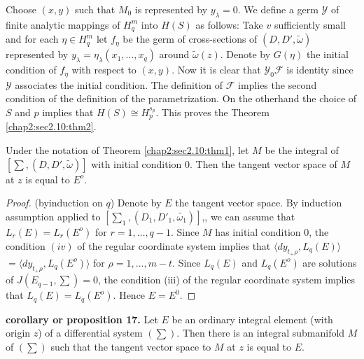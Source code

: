 \setcounter{proof of theorem}{1}
\begin{proof of theorem}%
  Choose $(x, y)$ such that $M_0$ is represented by $y_\lambda =
  0$. We define a germ $\mathscr{Y}$ of finite analytic mappings of
  $H^m_q$ into $H(S)$ as follows: Take $v$ sufficiently small and for
  each $\eta \in H^m_q$ let $f_\eta$ be the germ of cross-sections of
  $(D, D' , \tilde{\omega})$ represented by $y_\lambda = \eta_\lambda
  (x_1 , \ldots , x_q)$ around $\tilde{\omega} (z)$. Denote by $G(
  \eta)$ the initial condition of $f_\eta$ with respect to $(x,
  y)$. Now it is clear that $\mathscr{Y}_0 \mathscr{F}$ is identity
  since $\mathscr{Y}$ associates the initial condition. The definition
  of $\mathscr{F}$ implies the second condition of the definition of
  the parametrization. On the otherhand the choice of $S$ and $p$
  implies that $H(S) \cong H^{s_p}_p$. This proves the Theorem
  \ref{chap2:sec2.10:thm2}.  
\end{proof of theorem} 

\begin{proposition}\label{chap2:sec2.11:prop17} %
  Under the notation of Theorem \ref{chap2:sec2.10:thm1}, let $M$ be the integral of $[
    \sum, (D, D', \tilde{\omega})]$ with initial condition $0$. Then
  the tangent vector space of $M$ at  $z$ is equal to $E^o$.  
\end{proposition}

\begin{proof}
  (by\pageoriginale induction on $q$) Denote by $E$ the tangent vector space. By
  induction assumption applied to $[\sum_1, (D_1 , D'_1,
    \tilde{\omega_1})]$,, we can assume that $L_r(E)= L_r (E^o)$ for
  $r=1, \ldots, q-1$. Since $M$ has initial condition $0$, the
  condition $(iv)$ of the regular coordinate system implies that
  $\langle dy_{t_+ \rho}, L_q(E) \rangle$ $=  \langle dy_{t_+ \rho},
  L_q(E^o) \rangle$ for $\rho =1  , \ldots , m-t$. Since $L_q(E)$
  and $L_q(E^o)$ are solutions  of $J(E_{q-1}, \sum ) =0$, the
  condition (iii) of the regular coordinate system implies that
  $L_q(E)= L_q(E^o)$. Hence $E = E^0$. 
\end{proof}

\noindent 
\textbf{corollary or proposition 17.} 
Let $E$ be an ordinary integral element (with origin $z$) of a
differential system $( \sum )$. Then there is an integral submanifold
$M$ of $(\sum )$ such that the tangent vector space to $M$ at $z$ is
equal to $E$. 
